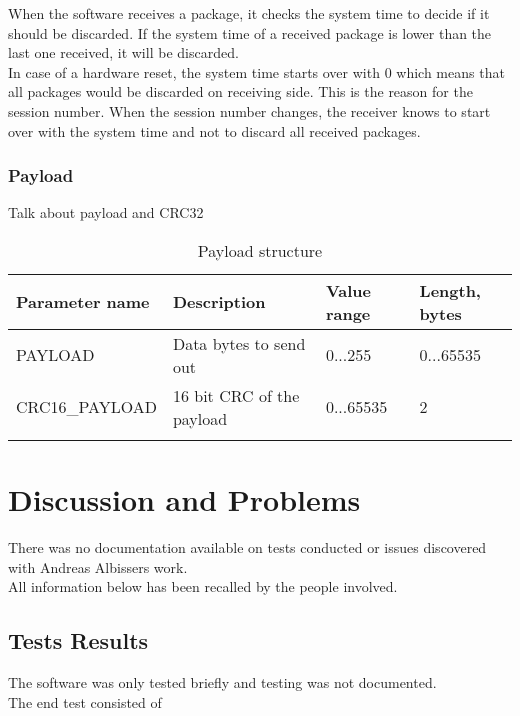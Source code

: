 When the software receives a package, it checks the system time to decide if it should be discarded. If the system time of a received package is lower than the last one received, it will be discarded.\\
In case of a hardware reset, the system time starts over with 0 which means that all packages would be discarded on receiving side. This is the reason for the session number. When the session number changes, the receiver knows to start over with the system time and not to discard all received packages.\\
%
\subsubsection{Payload}
Talk about payload and CRC32
%
%
\begin{center}
    \begin{longtable}{p{3cm}p{8cm}p{2cm}p{1cm}}
        \hline
        \textbf{Parameter name} & \textbf{Description} & \textbf{Value range} & \textbf{Length, bytes} \\
        \hline
        PAYLOAD & Data bytes to send out & 0...255 & 0...65535\\
        \hline
        CRC16\_PAYLOAD &  16 bit CRC of the payload & 0...65535 & 2\\
        \hline
        \caption{Payload structure}
        \label{Payload structure}    
    \end{longtable}
\end{center}
%
%
%
%
%
\section{Discussion and Problems} \label{Teensy 3.1 software problems}
There was no documentation available on tests conducted or issues discovered with Andreas Albissers work.\\
All information below has been recalled by the people involved.\\
%
%
\subsection{Tests Results}
The software was only tested briefly and testing was not documented. \\
The end test consisted of 
%
